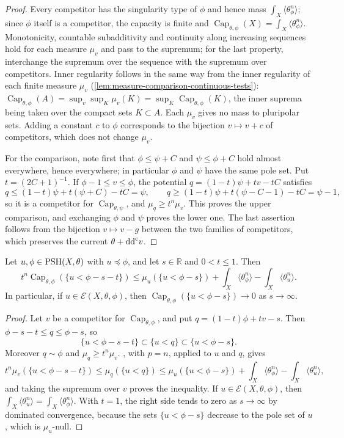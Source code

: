 \begin{proof}
Every competitor has the singularity type of $\phi$ and hence mass $\int_X\langle\theta_\phi^n\rangle$; since $\phi$ itself is a competitor, the capacity is finite and $\operatorname{Cap}_{\theta,\phi}(X)=\int_X\langle\theta_\phi^n\rangle$. Monotonicity, countable subadditivity and continuity along increasing sequences hold for each measure $\mu_v$ and pass to the supremum; for the last property, interchange the supremum over the sequence with the supremum over competitors. Inner regularity follows in the same way from the inner regularity of each finite measure $\mu_v$ (\cref{lem:measure-comparison-continuous-tests}): $\operatorname{Cap}_{\theta,\phi}(A)=\sup_v\sup_K\mu_v(K)=\sup_K\operatorname{Cap}_{\theta,\phi}(K)$, the inner suprema being taken over the compact sets $K\subset A$. Each $\mu_v$ gives no mass to pluripolar sets. Adding a constant $c$ to $\phi$ corresponds to the bijection $v\mapsto v+c$ of competitors, which does not change $\mu_v$.

For the comparison, note first that $\phi\leq\psi+C$ and $\psi\leq\phi+C$ hold almost everywhere, hence everywhere; in particular $\phi$ and $\psi$ have the same pole set. Put $t=(2C+1)^{-1}$. If $\phi-1\leq v\leq\phi$, the potential $q=(1-t)\psi+tv-tC$ satisfies
\[
 q\leq(1-t)\psi+t(\psi+C)-tC=\psi,\qquad
 q\geq(1-t)\psi+t(\psi-C-1)-tC=\psi-1,
\]
so it is a competitor for $\operatorname{Cap}_{\theta,\psi}$, and $\mu_q\geq t^n\mu_v$. This proves the upper comparison, and exchanging $\phi$ and $\psi$ proves the lower one. The last assertion follows from the bijection $v\mapsto v-g$ between the two families of competitors, which preserves the current $\theta+\mathrm{dd}^{\mathrm{c}} v$.
\end{proof}

\begin{proposition}\label{prop:relative-capacity-sublevel-estimate}
Let $u,\phi\in\mathrm{PSH}(X,\theta)$ with $u\preceq\phi$, and let $s\in\mathbb R$ and $0<t\leq1$. Then
\[
 t^n\operatorname{Cap}_{\theta,\phi}(\{u<\phi-s-t\})
       \leq\mu_u(\{u<\phi-s\})+\int_X\langle\theta_\phi^n\rangle-\int_X\langle\theta_u^n\rangle.
\]
In particular, if $u\in\mathcal E(X,\theta,\phi)$, then $\operatorname{Cap}_{\theta,\phi}(\{u<\phi-s\})\to0$ as $s\to\infty$.
\end{proposition}
\begin{proof}
Let $v$ be a competitor for $\operatorname{Cap}_{\theta,\phi}$, and put $q=(1-t)\phi+tv-s$. Then $\phi-s-t\leq q\leq\phi-s$, so
\[
 \{u<\phi-s-t\}\subset\{u<q\}\subset\{u<\phi-s\}.
\]
Moreover $q\sim\phi$ and $\mu_q\geq t^n\mu_v$. , with $p=n$, applied to $u$ and $q$, gives
\[
 t^n\mu_v(\{u<\phi-s-t\})\leq\mu_q(\{u<q\})
           \leq\mu_u(\{u<\phi-s\})+\int_X\langle\theta_\phi^n\rangle-\int_X\langle\theta_u^n\rangle,
\]
and taking the supremum over $v$ proves the inequality. If $u\in\mathcal E(X,\theta,\phi)$, then $\int_X\langle\theta_u^n\rangle=\int_X\langle\theta_\phi^n\rangle$. With $t=1$, the right side tends to zero as $s\to\infty$ by dominated convergence, because the sets $\{u<\phi-s\}$ decrease to the pole set of $u$, which is $\mu_u$-null.
\end{proof}


